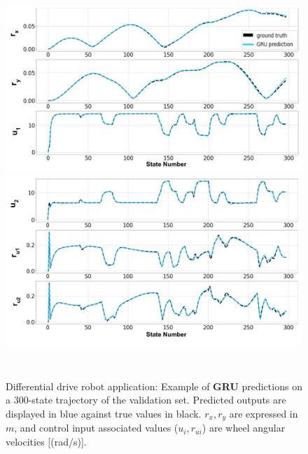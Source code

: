 \begin{figure}[h!]
    \centering
    \begin{minipage}{0.49\linewidth}
        \centering
        \includegraphics[width=\linewidth]{figures/learning_unic/pred_val_1_labeled.jpg}
    \end{minipage}
    \begin{minipage}{0.49\linewidth}
        \centering
        \includegraphics[width=\linewidth]{figures/learning_unic/pred_val_2_labeled.jpg}
    \end{minipage}\\
    \caption{Differential drive robot application: Example of \textbf{GRU} predictions on a 300-state trajectory of the validation set. 
    Predicted outputs are displayed in blue against true values in black. $r_{x}, r_{y}$ are expressed in $m$, and control input associated values ($u_{i},r_{ui}$) are wheel angular velocities [(rad/s)].}
    \label{fig:pred_val_unic}
\end{figure}

